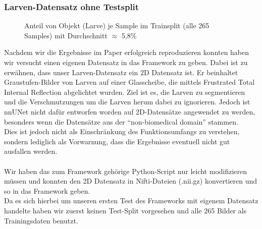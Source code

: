 \subsubsection{Larven-Datensatz ohne Testsplit}
\begin{figure}[H]
\centering

\caption{Anteil von Objekt (Larve) je Sample im Trainsplit (alle 265 Samples) mit Durchschnitt $\approx$ 5,8\%}
\label{pic:Haeuf_200}
\end{figure}
Nachdem wir die Ergebnisse im Paper erfolgreich reproduzieren konnten haben wir versucht einen eigenen Datensatz in das Framework zu geben. Dabei ist zu erwähnen, dass unser Larven-Datensatz ein 2D Datensatz ist. Er beinhaltet Graustufen-Bilder von Larven auf einer Glasscheibe, die mittels Frustrated Total Internal Reflection abgelichtet wurden. Ziel ist es, die Larven zu segmentieren und die Verschmutzungen um die Larven herum dabei zu ignorieren. Jedoch ist nnUNet nicht dafür entworfen worden auf 2D-Datensätze angewendet zu werden, besonders wenn die Datensätze aus der \enquote{non-biomedical domain} \cite{nnunetGithub2D-Daten} stammen.\\
Dies ist jedoch nicht als Einschränkung des Funktionsumfangs zu verstehen, sondern lediglich als Vorwarnung, dass die Ergebnisse eventuell nicht gut ausfallen werden.\\\\
Wir haben das zum Framework gehörige Python-Script \cite{nnunetGithub2D-Pythonscript} nur leicht modifizieren müssen und konnten den 2D Datensatz in Nifti-Dateien (.nii.gz) konvertieren und so in das Framework geben.\\
Da es sich hierbei um unseren ersten Test des Frameworks mit eigenem Datensatz handelte haben wir zuerst keinen Test-Split vorgesehen und alle 265 Bilder als Trainingsdaten benutzt.
